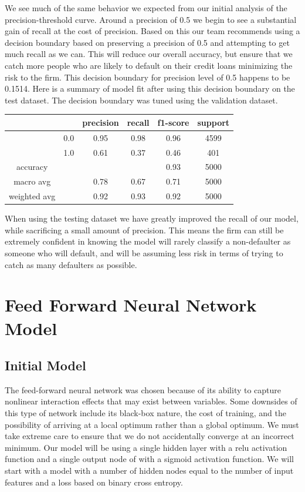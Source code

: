 \documentclass[12pt]{article}
\begin{document}
	We see much of the same behavior we expected from our initial analysis of the precision-threshold curve. Around a precision of 0.5 we begin to see a substantial gain of recall at the cost of precision. Based on this our team recommends using a decision boundary based on preserving a precision of 0.5 and attempting to get much recall as we can. This will reduce our overall accuracy, but ensure that we catch more people who are likely to default on their credit loans minimizing the risk to the firm. This decision boundary for precision level of 0.5 happens to be 0.1514. Here is a summary of model fit after using this decision boundary on the test dataset. The decision boundary was tuned using the validation dataset. 
	
	
	\begin{tabular}{c|c|c|c|c|c}
	\hline
				& 		& 	precision &  recall  & f1-score   & support \\ \hline
	
				&  0.0	&		0.95 &     0.98   &  0.96   &  4599 \\ \hline
				&  1.0  &		0.61 &     0.37   &  0.46   &   401 \\ \hline
	
	accuracy    & & & &                       		  0.93   &   5000 \\ \hline
	macro avg   & &   			0.78   &   0.67  &    0.71   &   5000  \\ \hline
	weighted avg  & &   		0.92   &   0.93  &    0.92   &   5000 \\ \hline
	\end{tabular}	
	 
	
	When using the testing dataset we have greatly improved the recall of our model, while sacrificing a small amount of precision. This means the firm can still be extremely confident in knowing the model will rarely classify a non-defaulter as someone who will default, and will be assuming less risk in terms of trying to catch as many defaulters as possible. 
	
	
	\section{Feed Forward Neural Network Model}
	
	\subsection{Initial Model}
	
	The feed-forward neural network was chosen because of its ability to capture nonlinear interaction effects that may exist between variables. Some downsides of this type of network include its black-box nature, the cost of training, and the possibility of arriving at a local optimum rather than a global optimum. We must take extreme care to ensure that we do not accidentally converge at an incorrect minimum. Our model will be using a single hidden layer with a relu activation function and a single output node of with a sigmoid activation function. We will start with a model with a number of hidden nodes equal to the number of input features and a loss based on binary cross entropy. 
	
\end{document}
